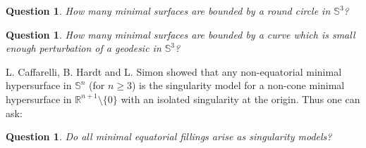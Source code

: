 \documentclass[11pt, reqno]{amsart}
\newtheorem{question}[thm]{Question}
\numberwithin{equation}{section}
\begin{document}
\begin{question}
How many minimal surfaces are bounded by a \emph{round} circle in $\mathbb{S}^3$?
\end{question}

\begin{question}
How many minimal surfaces are bounded by a curve which is small enough perturbation of a geodesic in $\mathbb{S}^3$?  
\end{question}

L. Caffarelli, B. Hardt and L. Simon \cite{CHS} showed that any non-equatorial minimal hypersurface in $\mathbb{S}^n$ (for $n\geq 3$) is the singularity model for a non-cone minimal hypersurface in $\mathbb{R}^{n+1}\setminus\{0\}$ with an isolated singularity at the origin.  Thus one can ask:
\begin{question}
Do all minimal equatorial fillings arise as singularity models?
\end{question}
\end{document}
